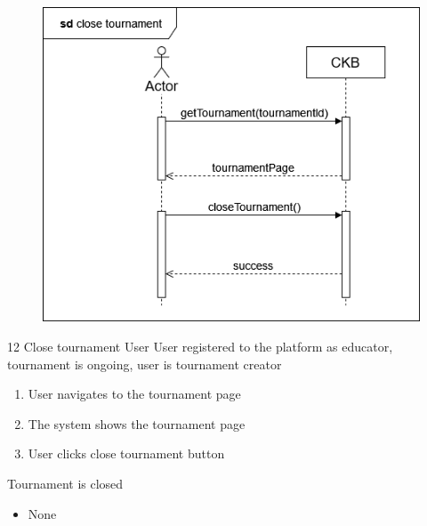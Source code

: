 \usecase
{
    \begin{figure}[H]
        \centering
        \includegraphics[width=\textwidth]{src/sd_diagrams/closetourn.png}
    \end{figure}
}
{12}
{Close tournament} %
{User} %
{User registered to the platform as educator, tournament is ongoing, user is tournament creator} %
{ %
    \begin{enumerate}
        \item User navigates to the tournament page
        \item The system shows the tournament page
        \item User clicks close tournament button
    \end{enumerate}
}
{Tournament is closed} %
{ %
    \begin{itemize}
        \item None
    \end{itemize}
}
{ %

}

